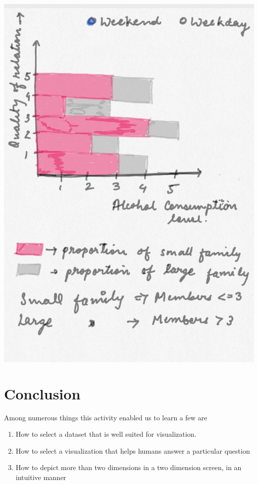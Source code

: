 \documentclass[titlepage, 12pt]{article}
\begin{document}
\begin{center}
\includegraphics[scale=0.3]{8}
\end{center}

\section{Conclusion}
Among numerous things this activity enabled us to learn a few are
\begin{enumerate}

    \item How to select a dataset that is well suited for visualization.

    \item How to select a visualization that helps humans answer a particular
        question
        
    \item How to depict more than two dimensions in a two dimension screen, in
        an intuitive manner

\end{enumerate}
\end{document}
